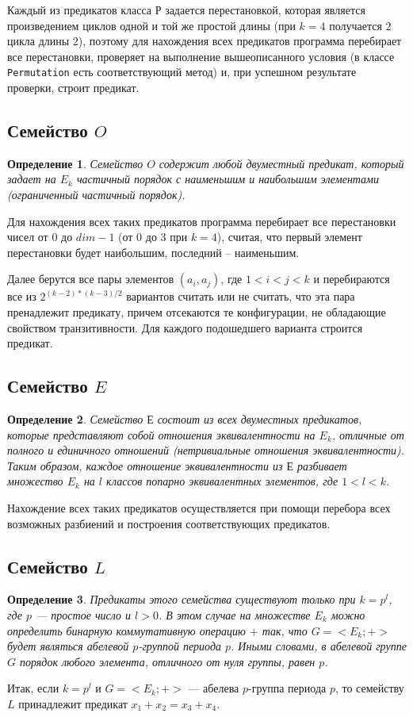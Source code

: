 \documentclass[a4paper,14pt]{extreport}
\newtheorem{opr}{Определение}
\begin{document}
Каждый из предикатов класса $Р$ задается перестановкой, которая является произведением циклов одной и той же простой длины (при $k=4$ получается $2$ цикла длины $2$), поэтому для нахождения всех предикатов программа перебирает все перестановки, проверяет на выполнение вышеописанного условия (в классе {\tt Permutation} есть соответствующий метод) и, при успешном результате проверки, строит предикат.

\subsection{Семейство $O$}
\begin{opr}
Семейство $O$ содержит любой двуместный предикат, который задает на $E_k$ частичный порядок с
наименьшим и наибольшим элементами (ограниченный частичный порядок). 
\end{opr}

Для нахождения всех таких предикатов программа перебирает все перестановки чисел от $0$ до $dim-1$ (от $0$ до $3$ при $k=4$), считая, что первый элемент перестановки будет наибольшим, последний – наименьшим. 

Далее берутся все пары элементов $(a_i,a_j)$, где $1<i<j<k$ и перебираются все из $2^{(k-2)*(k-3)/2}$ вариантов считать или не считать, что эта пара пренадлежит предикату, причем отсекаются те конфигурации, не обладающие свойством транзитивности. Для каждого подошедшего варианта строится предикат.

\subsection{Семейство $E$}
\begin{opr}
Семейство $Е$ состоит из всех двуместных предикатов, которые  представляют собой отношения эквивалентности на $E_{k}$, отличные от полного и единичного отношений (нетривиальные отношения эквивалентности). Таким образом, каждое отношение эквивалентности из $Е$ разбивает множество $E_{k}$ на $l$ классов попарно эквивалентных элементов, где $1 < l < k$. 
\end{opr}
Нахождение всех таких предикатов осуществляется при помощи перебора всех возможных разбиений и построения соответствующих предикатов. 

\subsection{Семейство $L$}
\begin{opr}
Предикаты этого семейства существуют только при $k = p^l$, где $p$ — простое число и $l > 0$. В этом случае на множестве $E_k$ можно определить бинарную коммутативную операцию $+$ так, 
что $G = <E_k;+>$ будет являться абелевой $p$-группой периода $p$. Иными словами, в абелевой группе $G$ порядок любого элемента, отличного от нуля группы, равен $p$. 
\end{opr}
Итак, если $k = p^l$ и $G = <E_k; +>$ — абелева $p$-группа периода $p$, то семейству $L$ принадлежит предикат $x_1+x_2=x_3+x_4$. 
\end{document}
